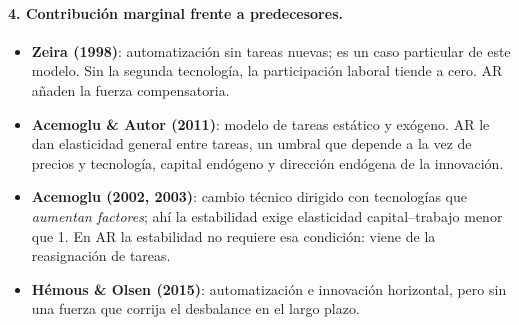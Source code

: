 \documentclass[11pt,a4paper]{article}
\theoremstyle{definition}
\theoremstyle{plain}
\theoremstyle{remark}
\numberwithin{equation}{section}
\begin{document}
\paragraph{4. Contribución marginal frente a predecesores.}
\begin{itemize}[nosep]
  \item \textbf{Zeira (1998)}: automatización sin tareas nuevas; es un caso particular de este modelo. Sin la segunda
        tecnología, la participación laboral tiende a cero. AR añaden la fuerza compensatoria.
  \item \textbf{Acemoglu \& Autor (2011)}: modelo de tareas estático y exógeno. AR le dan elasticidad general entre
        tareas, un umbral que depende a la vez de precios y tecnología, capital endógeno y dirección endógena de la
        innovación.
  \item \textbf{Acemoglu (2002, 2003)}: cambio técnico dirigido con tecnologías que \emph{aumentan factores}; ahí la
        estabilidad exige elasticidad capital--trabajo menor que 1. En AR la estabilidad no requiere esa condición:
        viene de la reasignación de tareas.
  \item \textbf{Hémous \& Olsen (2015)}: automatización e innovación horizontal, pero sin una fuerza que corrija el
        desbalance en el largo plazo.
\end{itemize}
\end{document}

